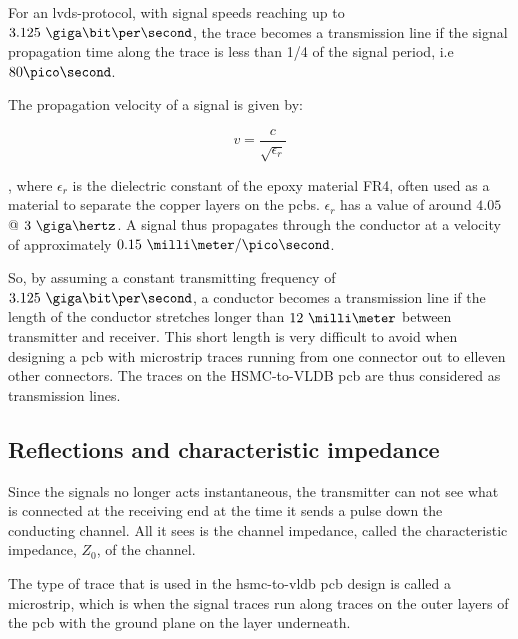 \documentclass[main.tex]{subfiles}
\begin{document}
For an \gls{lvds}-protocol, with signal speeds reaching up to $3.125\ \giga\bit\per\second$, the trace becomes a transmission line if the signal propagation time along the trace is less than 1/4 of the signal period, i.e $80\pico\second$. 

The propagation velocity of a signal is given by:

\begin{equation}
    v = \frac{c}{\sqrt{\epsilon_r}}
\end{equation}

, where $\epsilon_r$ is the dielectric constant of the epoxy material FR4, often used as a material to separate the copper layers on the \glspl{pcb}. $\epsilon_r$ has a value of around $4.05$ @ $3\ \giga\hertz$. \cite{polar15}
A signal thus propagates through the conductor at a velocity of approximately $0.15\ \milli\meter/\pico\second$. \cite[example 13.7]{weste11}

So, by assuming a constant transmitting frequency of $3.125\ \giga\bit\per\second$, a conductor becomes a transmission line if the length of the conductor stretches longer than $12\ \milli\meter$ between transmitter and receiver. This short length is very difficult to avoid when designing a \gls{pcb} with microstrip traces running from one connector out to elleven other connectors. The traces on the HSMC-to-VLDB \gls{pcb} are thus considered as transmission lines. 


\subsection{Reflections and characteristic impedance}

Since the signals no longer acts instantaneous, the transmitter can not see what is connected at the receiving end at the time it sends a pulse down the conducting channel. All it sees is the channel impedance, called the characteristic impedance, $Z_0$, of the channel. \cite{weste11}

The type of trace that is used in the \gls{hsmc}-to-\gls{vldb} \gls{pcb} design is called a microstrip, which is when the signal traces run along traces on the outer layers of the \gls{pcb} with the ground plane on the layer underneath. 

\end{document}
